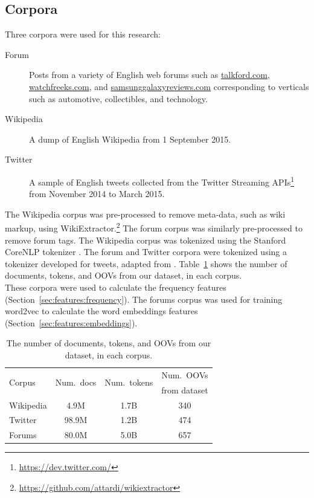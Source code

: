 \documentclass[10pt, a4paper]{article}
\newcommand{\secref}[2][]{Section#1~\ref{#2}\xspace}
\newcommand{\tabref}[2][]{Table#1~\ref{#2}\xspace}
\begin{document}
\subsection{Corpora\label{sec:corpora}}


Three corpora were used for this research: 

\begin{description}
\item[Forum] Posts from a variety of English web forums such as
  \url{talkford.com}, \url{watchfreeks.com}, and
  \url{samsunggalaxyreviews.com} corresponding to verticals such as
  automotive, collectibles, and technology.
\item[Wikipedia] A dump of English Wikipedia from 1 September 2015.
\item[Twitter] A sample of English tweets collected from the Twitter
  Streaming APIs\footnote{\url{https://dev.twitter.com/}} from
  November 2014 to March 2015.
\end{description}


\noindent
The Wikipedia corpus was pre-processed to remove meta-data, such as
wiki markup, using
WikiExtractor.\footnote{\url{https://github.com/attardi/wikiextractor}}
The forum corpus was similarly pre-processed to remove forum tags.
The Wikipedia corpus was tokenized using the Stanford CoreNLP
tokenizer \cite{Manning+:2014}. The forum and Twitter corpora were
tokenized using a tokenizer developed for tweets, adapted from
\cite{OConnor+:2010}. \tabref{tbl:corpora} shows the number of
documents, tokens, and OOVs from our dataset, in each corpus.\\

These corpora were used to calculate the frequency features
(\secref{sec:features:frequency}). The forums corpus was used for
training word2vec to calculate the word embeddings features
(\secref{sec:features:embeddings}).

\begin{table}
\begin{center}
\begin{tabular}{lccc}
\multirow{2}{*}{Corpus}&\multirow{2}{*}{Num.\ docs}&\multirow{2}{*}{Num.\ tokens} &Num.\ OOVs\\ 
& & & from dataset \\
 \hline
Wikipedia&4.9M&1.7B&340\\
Twitter&98.9M&1.2B&474\\
Forums&80.0M&5.0B&657\\
\end{tabular}
\end{center}
\caption{The number of documents, tokens, and OOVs from our dataset,
  in each corpus.
\label{tbl:corpora}}
\end{table}
\end{document}
